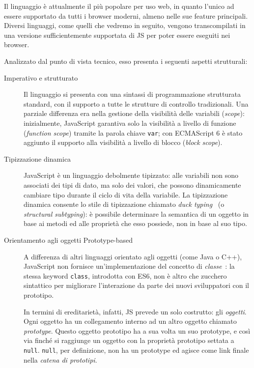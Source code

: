       Il linguaggio è attualmente il più popolare per uso web, in quanto l'unico ad essere supportato da tutti i browser moderni, almeno nelle sue feature principali.
      Diversi linguaggi, come quelli che vedremo in seguito, vengono transcompilati in una versione sufficientemente supportata di JS per poter essere eseguiti nei browser.

      Analizzato dal punto di vista tecnico, esso presenta i seguenti aspetti strutturali:

      \begin{description}
        \item[Imperativo e strutturato]
          Il linguaggio si presenta con una sintassi di programmazione strutturata standard, con il supporto a tutte le strutture di controllo tradizionali.
          Una parziale differenza era nella gestione della visibilità delle variabili (\emph{scope}):
          inizialmente, JavaScript garantiva solo la visibilità a livello di funzione (\emph{function scope}) tramite la parola chiave \texttt{var};
          con ECMAScript 6 è stato aggiunto il supporto alla visibilità a livello di blocco (\emph{block scope}).

        \item[Tipizzazione dinamica]
          JavaScript è un linguaggio debolmente tipizzato:
          alle variabili non sono associati dei tipi di dato, ma solo dei valori, che possono dinamicamente cambiare tipo durante il ciclo di vita della variabile.
          La tipizzazione dinamica consente lo stile di tipizzazione chiamato \emph{duck typing}~\cite{10.1145/2103621.2103686} (o \emph{structural subtyping}):
          è possibile determinare la semantica di un oggetto in base ai metodi ed alle proprietà che esso possiede,  non in base al suo tipo.

        \item[Orientamento agli oggetti Prototype-based]
          A differenza di altri linguaggi orientato agli oggetti (come Java o C++), JavaScript non fornisce un'implementazione del concetto di \emph{classe}~\cite{Ungar1991}:
          la stessa keyword \texttt{class}, introdotta con ES6, non è altro che zucchero sintattico per migliorare l'interazione da parte dei nuovi sviluppatori con il prototipo.

          In termini di ereditarietà, infatti, JS prevede un solo costrutto: gli \emph{oggetti}.
          Ogni oggetto ha un collegamento interno ad un altro oggetto chiamato \emph{prototype}.
          Questo oggetto prototipo ha a sua volta un suo prototype, e così via finché si raggiunge un oggetto con la proprietà prototipo settata a \texttt{null}.
          \texttt{null}, per definizione, non ha un prototype ed agisce come link finale nella \emph{catena di prototipi}.


\end{description}
